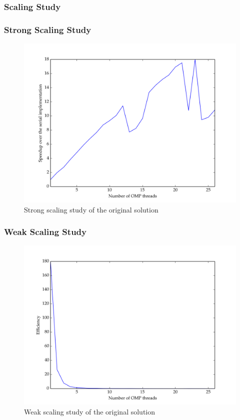 \documentclass[11pt]{article}
\begin{document}
\subsubsection{Scaling Study} \label{sec:speedup}
\subsubsection{Strong Scaling Study}
\begin{figure}[H]
\centering
\includegraphics[scale=0.8]{./scaling_studies/strong_scaling_original.png}
\caption{Strong scaling study of the original solution}
\label{fig:ss_orig}
\end{figure}
\subsubsection{Weak Scaling Study}
\begin{figure}[H]
\centering
\includegraphics[scale=0.8]{./scaling_studies/weak_scaling_original.png}
\caption{Weak scaling study of the original solution}
\label{fig:ss_orig}
\end{figure}
\end{document}
